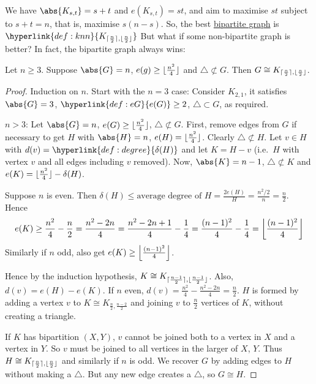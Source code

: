 \documentclass{article}
\DeclarePairedDelimiter\ceil{\lceil}{\rceil}
\DeclarePairedDelimiter\floor{\lfloor}{\rfloor}
\begin{document}
We have $\abs{K_{s, t}} = s + t$ and $e(K_{s, t}) = st$, and aim to maximise $st$ subject to $s + t = n$, that is, maximise $s(n-s)$.
So, the best \hyperlink{def:bipartite}{bipartite graph} is $\hyperlink{def:knn}{K_{\ceil{\frac{n}{2}}, \floor{\frac{n}{2}}}}$
But what if some non-bipartite graph is better?
In fact, the bipartite graph always wins:

\begin{nthm}\label{thm:8}
    Let $n \geq 3$. Suppose $\abs{G} = n$, $e(g) \geq \floor{\frac{n^2}{4}}$ and $\triangle \not\subset G$.
    Then $G \cong K_{\ceil{\frac{n}{2}}, \floor{\frac{n}{2}}}$.
\end{nthm}

\begin{proof}
    Induction on $n$. Start with the $n=3$ case: Consider $K_{2, 1}$, it satisfies $\abs{G} = 3$, $\hyperlink{def:eG}{e(G)} \geq 2$, $\triangle \subset G$, as required.

    $n>3$: Let $\abs{G} = n$, $e(G) \geq \floor{\frac{n^2}{4}}$, $\triangle \not\subset G$.
    First, remove edges from $G$ if necessary to get $H$ with $\abs{H} = n$, $e(H) = \floor{\frac{n^2}{4}}$. Clearly $\triangle \not\subset H$.
    Let $v \in H$ with $d(v) = \hyperlink{def:degree}{\delta(H)}$ and let $K = H - v$ (i.e.\ $H$ with vertex $v$ and all edges including $v$ removed).
    Now, $\abs{K} = n-1$, $\triangle \not\subset K$ and $e(K) = \floor{\frac{n^2}{4}} - \delta(H)$.

    Suppose $n$ is even. Then $\delta(H) \leq \text{average degree of } H = \frac{2 e(H)}{H} = \frac{n^2/2}{n} = \frac{n}{2}$.
    Hence
    \begin{equation*}
    e(K) \geq \frac{n^2}{4} - \frac{n}{2} = \frac{n^2 - 2n}{4} = \frac{n^2 - 2n + 1}{4} - \frac{1}{4} = \frac{(n-1)^2}{4} - \frac{1}{4} = \floor*{\frac{(n-1)^2}{4}}\end{equation*}
    Similarly if $n$ odd, also get $e(K) \geq \floor*{\frac{(n-1)^2}{4}}$.

    Hence by the induction hypothesis, $K \cong K_{\ceil{\frac{n-1}{2}}, \floor{\frac{n-1}{2}}}$.
    Also, $d(v) = e(H) - e(K)$.
    If $n$ even, $d(v) = \frac{n^2}{4} - \frac{n^2 - 2n}{4} = \frac{n}{2}$.
    $H$ is formed by adding a vertex $v$ to $K \cong K_{\frac{n}{2}, \frac{n-2}{2}}$ and joining $v$ to $\frac{n}{2}$ vertices of $K$, without creating a triangle.

    If $K$ has bipartition $(X, Y)$, $v$ cannot be joined both to a vertex in $X$ and a vertex in $Y$. So $v$ must be joined to all vertices in the larger of $X$, $Y$.
    Thus $H \cong K_{\ceil{\frac{n}{2}}, \floor{\frac{n}{2}}}$ and similarly if $n$ is odd.
    We recover $G$ by adding edges to $H$ without making a $\triangle$. But any new edge creates a $\triangle$, so $G \cong H$.
\end{proof}
\end{document}
